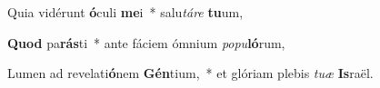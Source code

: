 \item Quia vidérunt \textbf{ó}culi \textbf{me}i~* salu\textit{tá}\textit{re} \textbf{tu}um,
\item \textbf{Quod} pa\textbf{rás}ti~* ante fáciem ómnium \textit{po}\textit{pu}\textbf{ló}rum,
\item Lumen ad revelati\textbf{ó}nem \textbf{Gén}tium,~* et glóriam plebis \textit{tu}\textit{æ} \textbf{Is}raël.

